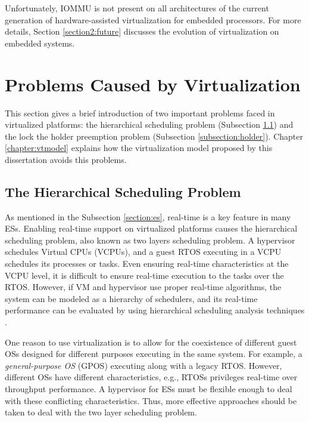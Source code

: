 Unfortunately, IOMMU is not present on all architectures of the current generation of hardware-assisted virtualization for embedded processors. For more details, Section \ref{section2:future} discusses the evolution of virtualization on embedded systems.


\section{Problems Caused by Virtualization}
\label{section:virt_challenges}

This section gives a brief introduction of two important problems faced in virtualized platforms: the hierarchical scheduling problem (Subsection \ref{subsection:twolayers}) and the lock the holder preemption problem (Subsection \ref{subsection:holder}). Chapter \ref{chapter:vtmodel} explains how the virtualization model proposed by this dissertation avoids this problems.

\subsection{The Hierarchical Scheduling Problem}
\label{subsection:twolayers}

As mentioned in the Subsection \ref{section:es}, real-time is a key feature in many ESs. Enabling real-time support on virtualized platforms causes the hierarchical scheduling problem, also known as two layers scheduling problem. A hypervisor schedules Virtual CPUs (VCPUs), and a guest RTOS executing in a VCPU schedules its processes or tasks. Even ensuring real-time characteristics at the VCPU level, it is difficult to ensure real-time execution to the tasks over the RTOS. However, if VM and hypervisor use proper real-time algorithms, the system can be modeled as a hierarchy of schedulers, and its real-time performance can be evaluated by using hierarchical scheduling analysis techniques \cite{cucinotta2009}.

One reason to use virtualization is to allow for the coexistence of different guest OSs designed for different purposes executing in the same system. For example, a \emph{general-purpose OS} (GPOS) executing along with a legacy RTOS. However, different OSs have different characteristics, e.g., RTOSs privileges real-time over throughput performance. A hypervisor for ESs must be flexible enough to deal with these conflicting characteristics. Thus, more effective approaches should be taken to deal with the two layer scheduling problem. 

